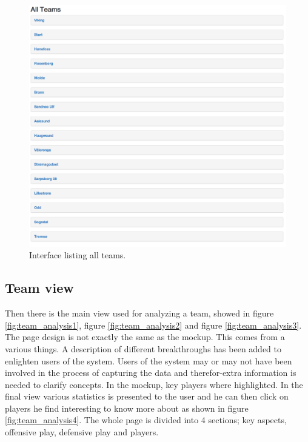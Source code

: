 \begin{figure}[H]
\centering
\includegraphics[width=1\textwidth]{images/general/all_teams.png}
\caption{Interface listing all teams.}
\label{fig:all_teams}
\end{figure}

\subsection{Team view}

Then there is the main view used for analyzing a team, showed in figure \ref{fig:team_analysis1}, figure \ref{fig:team_analysis2} and figure \ref{fig:team_analysis3}. The page design is not exactly the same as the mockup. This comes from a various things. A description of different breakthroughs has been added to enlighten users of the system. Users of the system may or may not have been involved in the process of capturing the data and therefor-extra information is needed to clarify concepts. In the mockup, key players where highlighted. In the final view various statistics is presented to the user and he can then click on players he find interesting to know more about as shown in figure \ref{fig:team_analysis4}. The whole page is divided into 4 sections; key aspects, offensive play, defensive play and players.

